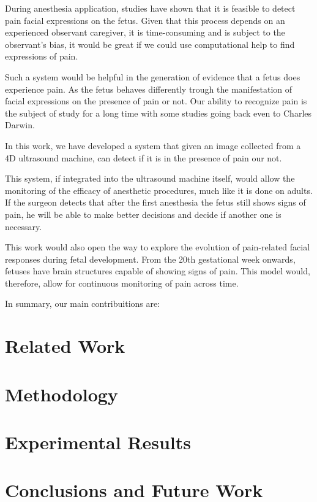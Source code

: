 \documentclass[msc]{ppgccufmg}
\begin{document}
During anesthesia application, studies have shown that it is feasible to detect pain facial expressions on the fetus. Given that this process depends on an experienced observant caregiver, it is time-consuming and is subject to the observant's bias, it would be great if we could use computational help to find expressions of pain. 

Such a system would be helpful in the generation of evidence that a fetus does experience pain. As the fetus behaves differently trough the manifestation of facial expressions on the presence of pain or not. Our ability to recognize pain is the subject of study for a long time with some studies going back even to Charles Darwin.

In this work, we have developed a system that given an image collected from a 4D ultrasound machine, can detect if it is in the presence of pain our not. 

This system, if integrated into the ultrasound machine itself, would allow the monitoring of the efficacy of anesthetic procedures, much like it is done on adults. If the surgeon detects that after the first anesthesia the fetus still shows signs of pain, he will be able to make better decisions and decide if another one is necessary.

This work would also open the way to explore the evolution of pain-related facial responses during fetal development. From the 20th gestational week onwards, fetuses have brain structures capable of showing signs of pain. This model would, therefore, allow for continuous monitoring of pain across time.

In summary, our main contribuitions are:

\chapter{Related Work}
\chapter{Methodology}
\chapter{Experimental Results}
\chapter{Conclusions and Future Work}

\end{document}
